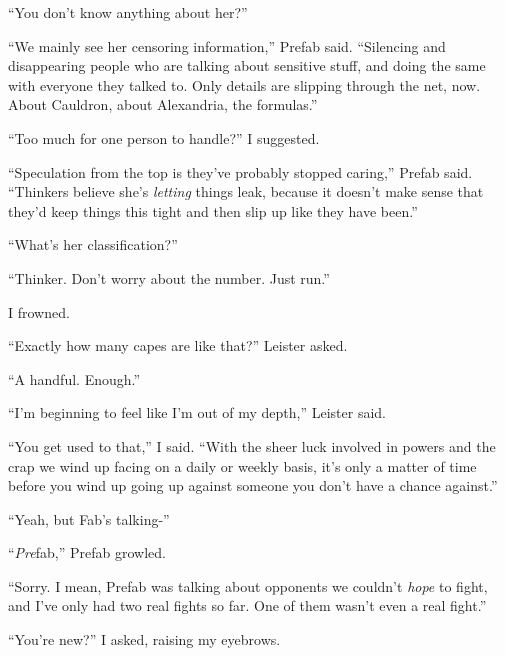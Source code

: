 ``You don't know anything about her?''



``We mainly see her censoring information,'' Prefab said.  ``Silencing and disappearing people who are talking about sensitive stuff, and doing the same with everyone they talked to.  Only details are slipping through the net, now.  About Cauldron, about Alexandria, the formulas.''



``Too much for one person to handle?'' I suggested.



``Speculation from the top is they've probably stopped caring,'' Prefab said.  ``Thinkers believe she's \emph{letting} things leak, because it doesn't make sense that they'd keep things this tight and then slip up like they have been.''



``What's her classification?''



``Thinker.  Don't worry about the number.  Just run.''



I frowned.



``Exactly how many capes are like that?'' Leister asked.



``A handful.  Enough.''



``I'm beginning to feel like I'm out of my depth,'' Leister said.



``You get used to that,'' I said.  ``With the sheer luck involved in powers and the crap we wind up facing on a daily or weekly basis, it's only a matter of time before you wind up going up against someone you don't have a chance against.''



``Yeah, but Fab's talking-''



``\emph{Pre}fab,'' Prefab growled.



``Sorry.  I mean, Prefab was talking about opponents we couldn't \emph{hope} to fight, and I've only had two real fights so far.  One of them wasn't even a real fight.''



``You're new?'' I asked, raising my eyebrows.



